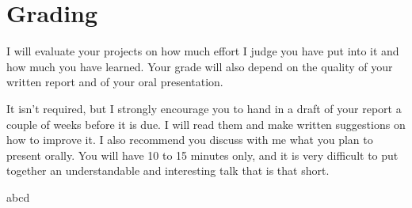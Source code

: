 \documentclass{article}
\begin{document}
\section{Grading}

I will evaluate your projects on how much effort I judge you have put
into it and how much you have learned.  Your grade will also depend on
the quality of your written report and of your oral presentation.  

It isn't required, but I strongly encourage you to hand in a draft of
your report a couple of weeks before it is due.  I will read them and
make written suggestions on how to improve it.  I also recommend you
discuss with me what you plan to present orally.  You will have 10 to
15 minutes only, and it is very difficult to put together an
understandable and interesting talk that is that short.

\begin{bibliography}

abcd

\end{bibliography}
\end{document}
